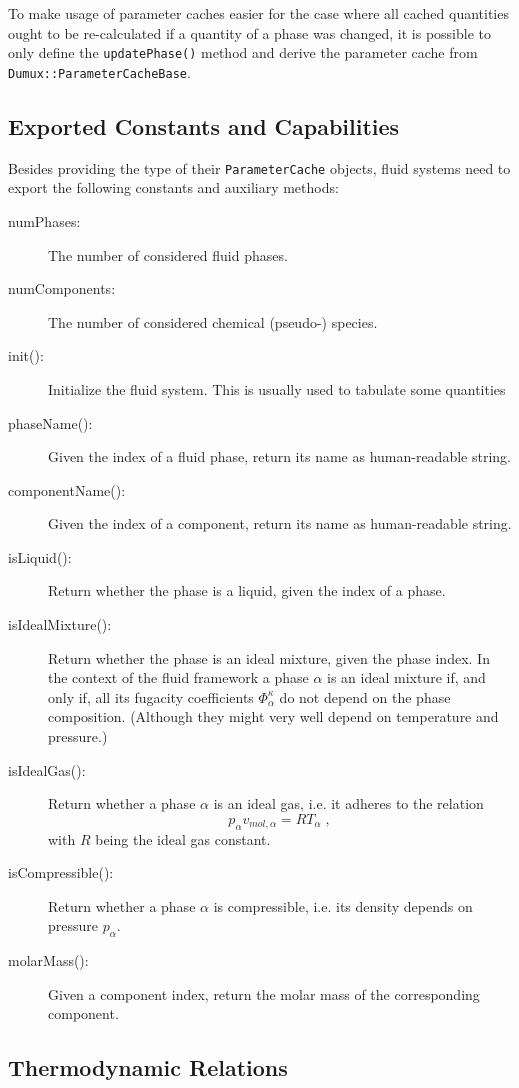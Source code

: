 To make usage of parameter caches easier for the case where all cached
quantities ought to be re-calculated if a quantity of a phase was
changed, it is possible to only define the \texttt{updatePhase()}
method and derive the parameter cache from
\texttt{Dumux::ParameterCacheBase}.

\subsection{Exported Constants and Capabilities}

Besides providing the type of their \texttt{ParameterCache} objects,
fluid systems need to export the following constants and auxiliary
methods:
\begin{description}
\item[numPhases:] The number of considered fluid phases.
\item[numComponents:] The number of considered chemical (pseudo-)
  species.
\item[init():] Initialize the fluid system. This is usually used to
  tabulate some quantities
\item[phaseName():] Given the index of a fluid phase, return its name
  as human-readable string.
\item[componentName():] Given the index of a component, return its
  name as human-readable string.
\item[isLiquid():] Return whether the phase is a liquid, given the
  index of a phase.
\item[isIdealMixture():] Return whether the phase is an ideal mixture,
  given the phase index. In the context of the \Dumux fluid
  framework a phase $\alpha$ is an ideal mixture if, and only if, all
  its fugacity coefficients $\Phi^\kappa_\alpha$ do not depend on the
  phase composition. (Although they might very well depend on
  temperature and pressure.)
\item[isIdealGas():] Return whether a phase $\alpha$ is an ideal gas,
  i.e. it adheres to the relation
  \[
  p_\alpha v_{mol,\alpha} = R T_\alpha \;,
  \]
  with $R$ being the ideal gas constant.
\item[isCompressible():] Return whether a phase $\alpha$ is
  compressible, i.e. its density depends on pressure $p_\alpha$.
\item[molarMass():] Given a component index, return the molar mass of
  the corresponding component.
\end{description}

\subsection{Thermodynamic Relations}

